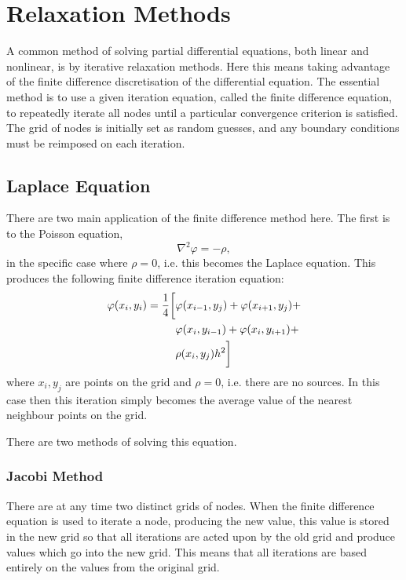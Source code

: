 \section{Relaxation Methods}
\label{sec:relaxation_methods}

A common method of solving partial differential equations, both linear and nonlinear, is by iterative relaxation methods. Here this means taking advantage of the finite difference discretisation of the differential equation. The essential method is to use a given iteration equation, called the finite difference equation, to repeatedly iterate all nodes until a particular convergence criterion is satisfied. The grid of nodes is initially set as random guesses, and any boundary conditions must be reimposed on each iteration.

\subsection{Laplace Equation}
There are two main application of the finite difference method here. The first is to the Poisson equation,
\begin{equation}
    \nabla^2 \varphi = -\rho,
    \label{eqn:poisson}
\end{equation} in the specific case where $\rho = 0$, i.e. this becomes the Laplace equation. This produces the following finite difference iteration equation:
\begin{align}
    \varphi(x_i,y_i) = \frac{1}{4}\bigg[&\varphi(x_{i-1},y_j)+\varphi(x_{i+1},y_j)+ \notag \\
        & \varphi(x_i,y_{i-1})+\varphi(x_i,y_{i+1})+ \label{eqn:iteration} \\
        & \rho(x_i,y_j)h^2\bigg] \notag
\end{align}
where $x_i,y_j$ are points on the grid and $\rho = 0$, i.e. there are no sources. In this case then this iteration simply becomes the average value of the nearest neighbour points on the grid.

There are two methods of solving this equation.

\subsubsection{Jacobi Method}

There are at any time two distinct grids of nodes. When the finite difference equation is used to iterate a node, producing the new value, this value is stored in the new grid so that all iterations are acted upon by the old grid and produce values which go into the new grid. This means that all iterations are based entirely on the values from the original grid.

